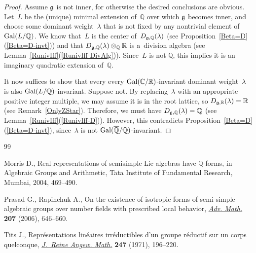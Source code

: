 \begin{proof}
Assume $\Lie G$ is not inner, for otherwise the desired conclusions are obvious.
Let~$L$ be the (unique) minimal extension of~$\mathbb{Q}$ over which $\Lie G$ becomes inner, and choose some dominant
weight~$\lambda$ that is not f\/ixed by any nontrivial element of~$\operatorname{Gal}(L/\mathbb{Q})$.
We know that~$L$ is the center of~$D_{\Lie G, \mathbb{Q}}(\lambda)$ (see Proposition~\ref{Beta=D}(\ref{Beta=D-invt})) and that $D_{\Lie
G, \mathbb{Q}}(\lambda) \otimes_\mathbb{Q} \mathbb{R}$ is a~division algebra (see Lemma~\ref{RunivIff}(\ref{RunivIff-DivAlg})).
Since~$L$ is not $\mathbb{Q}$, this implies it is an imaginary quadratic extension of~$\mathbb{Q}$.

It now suf\/f\/ices to show that every every $\operatorname{Gal}(\mathbb{C}/\mathbb{R})$-invariant dominant weight~$\lambda$ is also
$\operatorname{Gal}(L/\mathbb{Q})$-invariant.
Suppose not.
By replacing~$\lambda$ with an appropriate positive integer multiple, we may assume it is in the root lattice, so
$D_{\Lie G,\mathbb{R}}(\lambda) = \mathbb{R}$ (see Remark~\ref{OnlyZStar}).
Therefore, we must have $D_{\Lie G,\mathbb{Q}}(\lambda) = \mathbb{Q}$ (see Lemma~\ref{RunivIff}(\ref{RunivIff-D})).
However, this contradicts Proposition~\ref{Beta=D}(\ref{Beta=D-invt}), since~$\lambda$ is not
$\operatorname{Gal}(\overline{\mathbb{Q}}/\mathbb{Q})$-invariant.
\end{proof}

%
\begin{thebibliography}{99}

Morris D., Real representations of semisimple {L}ie algebras have {${\mathbb
  Q}$}-forms, in Algebraic Groups and Arithmetic, Tata Institute of Fundamental
  Research, Mumbai, 2004, 469--490.


Prasad G., Rapinchuk A., On the existence of isotropic forms of semi-simple
  algebraic groups over number f\/ields with prescribed local behavior,
  \href{http://dx.doi.org/10.1016/j.aim.2006.01.001}{\textit{Adv. Math.}} \textbf{207} (2006), 646--660.


Tits J., Repr\'esentations lin\'eaires irr\'eductibles d'un groupe r\'eductif
  sur un corps quelconque, \href{http://dx.doi.org/10.1515/crll.1971.247.196}{\textit{J.~Reine Angew. Math.}} \textbf{247} (1971),
  196--220.



\end{thebibliography}

